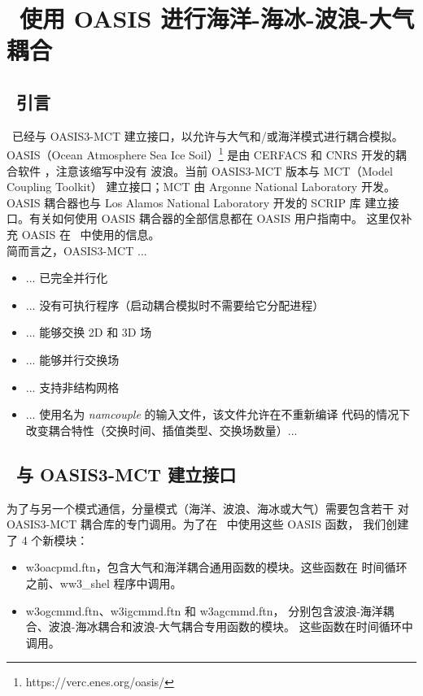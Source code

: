 \pagestyle{myheadings} \setcounter{page}{1} \setcounter{footnote}{0}

\section{~使用 OASIS 进行海洋-海冰-波浪-大气耦合} \label{app:coupling}
\newcounters

\vssub
\subsection{~引言} \label{sec:couplingA}
\vssub

\ws\ 已经与 OASIS3-MCT 建立接口，以允许与大气和/或海洋模式进行耦合模拟。
OASIS（Ocean Atmosphere Sea Ice Soil）\footnote{https://verc.enes.org/oasis/}
是由 CERFACS 和 CNRS 开发的耦合软件 \citep{art:VAL13}，注意该缩写中没有
波浪。当前 OASIS3-MCT 版本与 MCT（Model Coupling Toolkit）
\citep{art:LJO05,art:JLO05} 建立接口；MCT 由 Argonne National Laboratory
开发。OASIS 耦合器也与 Los Alamos National Laboratory 开发的 SCRIP 库
建立接口。有关如何使用 OASIS 耦合器的全部信息都在 OASIS 用户指南中。
这里仅补充 OASIS 在 \ws\ 中使用的信息。\\

简而言之，OASIS3-MCT ...

\begin{itemize}
  \item ... 已完全并行化
  \item ... 没有可执行程序（启动耦合模拟时不需要给它分配进程）
  \item ... 能够交换 2D 和 3D 场
  \item ... 能够并行交换场
  \item ... 支持非结构网格
  \item ... 使用名为 \textit{namcouple} 的输入文件，该文件允许在不重新编译
        代码的情况下改变耦合特性（交换时间、插值类型、交换场数量）...
\end{itemize}

\vssub
\subsection{~与 OASIS3-MCT 建立接口} \label{sec:couplingB}
\vssub

为了与另一个模式通信，分量模式（海洋、波浪、海冰或大气）需要包含若干
对 OASIS3-MCT 耦合库的专门调用。为了在 \ws\ 中使用这些 OASIS 函数，
我们创建了 4 个新模块：
\begin{itemize}
\item {\file w3oacpmd.ftn}，包含大气和海洋耦合通用函数的模块。这些函数在
      时间循环之前、{\code ww3\_shel} 程序中调用。
\item {\file w3ogcmmd.ftn}、{\file w3igcmmd.ftn} 和 {\file w3agcmmd.ftn}，
      分别包含波浪-海洋耦合、波浪-海冰耦合和波浪-大气耦合专用函数的模块。
      这些函数在时间循环中调用。
\end{itemize}

